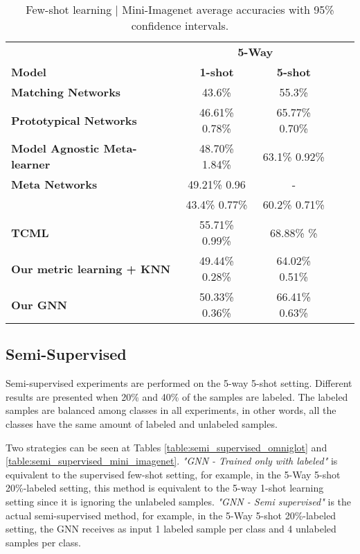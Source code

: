 \documentclass{article} \usepackage{iclr2018_conference,times}
\begin{document}
\begin{table*}[t!]
\centering
\begin{tabular}{l*{4}{c}} 

\hline &  \multicolumn{2}{c}{\textbf{5-Way}} \\
\textbf{Model} & \textbf{1-shot} & \textbf{5-shot}  \\ 
\hline

\textbf{Matching Networks} {\scriptsize\cite{vinyals2016matching}}
    & 43.6\%    &   55.3\%    \\  
\textbf{Prototypical Networks} {\scriptsize\cite{snell2017prototypical}} 
& 46.61\% 0.78\%    &   65.77\% 0.70\% \\   
\textbf{Model Agnostic Meta-learner} {\scriptsize\cite{finn2017model}}
& 48.70\% 1.84\%    &   63.1\% 0.92\%    \\   
\textbf{Meta Networks} {\scriptsize\cite{munkhdalai2017meta}}
& 49.21\% 0.96    &   -    \\   
\textbf{\citeauthor{ravi2016optimization}} {\scriptsize\cite{ravi2016optimization}}
& 43.4\% 0.77\% & 60.2\% 0.71\% \\
\textbf{TCML} {\scriptsize\cite{mishra2017meta}} 
& 55.71\% 0.99\%   &   68.88\% \%    \\   
\hline
\textbf{Our metric learning + KNN}
        & 49.44\% 0.28\%     &  64.02\% 0.51\% \\
\textbf{Our GNN} 
        & 50.33\% 0.36\%     &  66.41\% 0.63\% \\
\hline
\end{tabular}
   \caption{Few-shot learning | Mini-Imagenet  average accuracies with 95\% confidence intervals.}
\label{table:few_shot_mini_imagenet}
\end{table*}




\subsection{Semi-Supervised}
Semi-supervised experiments are performed on the 5-way 5-shot setting. Different results are presented when 20\% and 40\% of the samples are labeled. The labeled samples are balanced among classes in all experiments, in other words, all the classes have the same amount of labeled and unlabeled samples.

Two strategies can be seen at Tables \ref{table:semi_supervised_omniglot} and \ref{table:semi_supervised_mini_imagenet}. \textit{"GNN - Trained only with labeled"} is equivalent to the supervised few-shot setting, for example, in the 5-Way 5-shot 20\%-labeled setting, this method is equivalent to the 5-way 1-shot learning setting since it is ignoring the unlabeled samples. \textit{"GNN - Semi supervised"} is the actual semi-supervised method, for example, in the 5-Way 5-shot 20\%-labeled setting, the GNN receives as input 1 labeled sample per class and 4 unlabeled samples per class.
\end{document}
